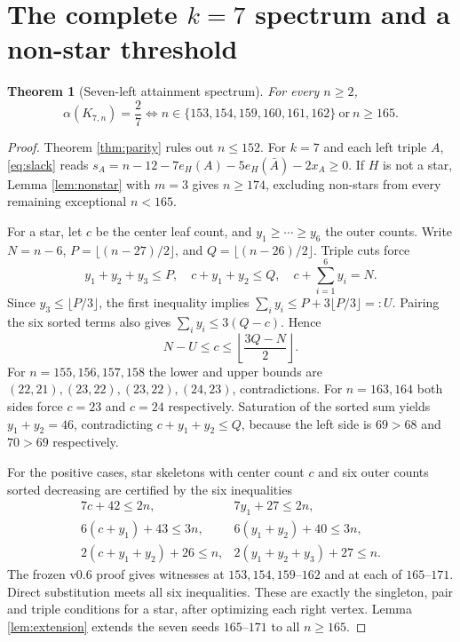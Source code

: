 \documentclass[11pt,a4paper]{article}
\newtheorem{theorem}{Theorem}[section]
\newcommand{\al}{\alpha}
\newcommand{\KK}[2]{K_{#1,#2}}
\begin{document}
\section{The complete $k=7$ spectrum and a non-star threshold}
\begin{theorem}[Seven-left attainment spectrum]\label{thm:k7}
For every $n\ge2$,
\[
\al(\KK{7}{n})=\frac27 \iff n\in\{153,154,159,160,161,162\}\ \text{or}\ n\ge165.
\]
\end{theorem}
\begin{proof}
Theorem \ref{thm:parity} rules out $n\le152$. For $k=7$ and each left triple $A$, \eqref{eq:slack} reads $s_A=n-12-7e_H(A)-5e_H(\bar A)-2x_A\ge0$. If $H$ is not a star, Lemma \ref{lem:nonstar} with $m=3$ gives $n\ge174$, excluding non-stars from every remaining exceptional $n<165$.

For a star, let $c$ be the center leaf count, and $y_1\ge\cdots\ge y_6$ the outer counts. Write $N=n-6$, $P=\lfloor(n-27)/2\rfloor$, and $Q=\lfloor(n-26)/2\rfloor$. Triple cuts force
\begin{equation}\label{eq:k7pq}
y_1+y_2+y_3\le P,\quad c+y_1+y_2\le Q,\quad c+\sum_{i=1}^6y_i=N.
\end{equation}
Since $y_3\le\lfloor P/3\rfloor$, the first inequality implies $\sum_i y_i\le P+3\lfloor P/3\rfloor=:U$. Pairing the six sorted terms also gives $\sum_i y_i\le3(Q-c)$. Hence
\begin{equation}\label{eq:k7bound}
N-U\le c\le \left\lfloor\frac{3Q-N}{2}\right\rfloor.
\end{equation}
For $n=155,156,157,158$ the lower and upper bounds are $(22,21),(23,22),(23,22),(24,23)$, contradictions. For $n=163,164$ both sides force $c=23$ and $c=24$ respectively. Saturation of the sorted sum yields $y_1+y_2=46$, contradicting $c+y_1+y_2\le Q$, because the left side is $69>68$ and $70>69$ respectively.

For the positive cases, star skeletons with center count $c$ and six outer counts sorted decreasing are certified by the six inequalities
\[
\begin{array}{ll}
7c+42\le2n,&7y_1+27\le2n,\\
6(c+y_1)+43\le3n,&6(y_1+y_2)+40\le3n,\\
2(c+y_1+y_2)+26\le n,&2(y_1+y_2+y_3)+27\le n.
\end{array}
\]
The frozen v0.6 proof gives witnesses at $153,154,159$--$162$ and at each of $165$--$171$. Direct substitution meets all six inequalities. These are exactly the singleton, pair and triple conditions for a star, after optimizing each right vertex. Lemma \ref{lem:extension} extends the seven seeds $165$--$171$ to all $n\ge165$.\end{proof}
\end{document}
